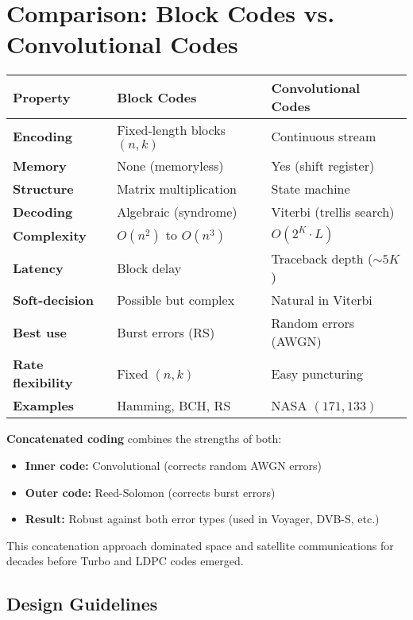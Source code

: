 \section{Comparison: Block Codes vs. Convolutional Codes}

\begin{center}
\begin{tabular}{@{}p{3cm}p{4.5cm}p{4.5cm}@{}}
\toprule
\textbf{Property} & \textbf{Block Codes} & \textbf{Convolutional Codes} \\
\midrule
\textbf{Encoding} & Fixed-length blocks $(n,k)$ & Continuous stream \\
\textbf{Memory} & None (memoryless) & Yes (shift register) \\
\textbf{Structure} & Matrix multiplication & State machine \\
\textbf{Decoding} & Algebraic (syndrome) & Viterbi (trellis search) \\
\textbf{Complexity} & $O(n^2)$ to $O(n^3)$ & $O(2^K \cdot L)$ \\
\textbf{Latency} & Block delay & Traceback depth ($\sim 5K$) \\
\textbf{Soft-decision} & Possible but complex & Natural in Viterbi \\
\textbf{Best use} & Burst errors (RS) & Random errors (AWGN) \\
\textbf{Rate flexibility} & Fixed $(n,k)$ & Easy puncturing \\
\textbf{Examples} & Hamming, BCH, RS & NASA $(171,133)$ \\
\bottomrule
\end{tabular}
\end{center}

\begin{keyconcept}
\textbf{Concatenated coding} combines the strengths of both:
\begin{itemize}
\item \textbf{Inner code:} Convolutional (corrects random AWGN errors)
\item \textbf{Outer code:} Reed-Solomon (corrects burst errors)
\item \textbf{Result:} Robust against both error types (used in Voyager, DVB-S, etc.)
\end{itemize}

This concatenation approach dominated space and satellite communications for decades before Turbo and LDPC codes emerged.
\end{keyconcept}

\subsection{Design Guidelines}\label{design-guidelines}

